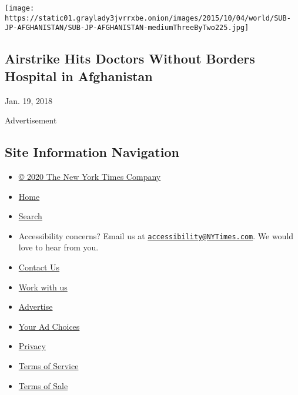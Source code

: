 \begin{itemize}
  \texttt{[image: https://static01.graylady3jvrrxbe.onion/images/2015/10/04/world/SUB-JP-AFGHANISTAN/SUB-JP-AFGHANISTAN-mediumThreeByTwo225.jpg]}

  \hypertarget{airstrike-hits-doctors-without-borders-hospital-in-afghanistan}{%
  \subsection{Airstrike Hits Doctors Without Borders Hospital in
  Afghanistan}\label{airstrike-hits-doctors-without-borders-hospital-in-afghanistan}}

  Jan. 19, 2018
\end{itemize}

Advertisement

\hypertarget{site-information-navigation}{%
\subsection{Site Information
Navigation}\label{site-information-navigation}}

\begin{itemize}
\tightlist
\item
  \href{https://help.nytimes3xbfgragh.onion/hc/en-us/articles/115014792127-Copyright-notice}{©
  2020 The New York Times Company}
\item
  \href{https://www.nytimes3xbfgragh.onion}{Home}
\item
  \href{https://www.nytimes3xbfgragh.onion/search/}{Search}
\item
  Accessibility concerns? Email us at
  \href{mailto:accessibility@NYTimes.com}{\nolinkurl{accessibility@NYTimes.com}}.
  We would love to hear from you.
\item
  \href{https://help.nytimes3xbfgragh.onion/hc/en-us/articles/115015385887-Contact-Us}{Contact
  Us}
\item
  \href{https://www.nytco.com/careers/}{Work with us}
\item
  \href{https://nytmediakit.com/}{Advertise}
\item
  \href{https://help.nytimes3xbfgragh.onion/hc/en-us/articles/115014892108-Privacy-policy\#pp}{Your
  Ad Choices}
\item
  \href{https://help.nytimes3xbfgragh.onion/hc/en-us/articles/115014892108-Privacy-policy}{Privacy}
\item
  \href{https://help.nytimes3xbfgragh.onion/hc/en-us/articles/115014893428-Terms-of-service}{Terms
  of Service}
\item
  \href{https://help.nytimes3xbfgragh.onion/hc/en-us/articles/115014893968-Terms-of-sale}{Terms
  of Sale}
\end{itemize}

